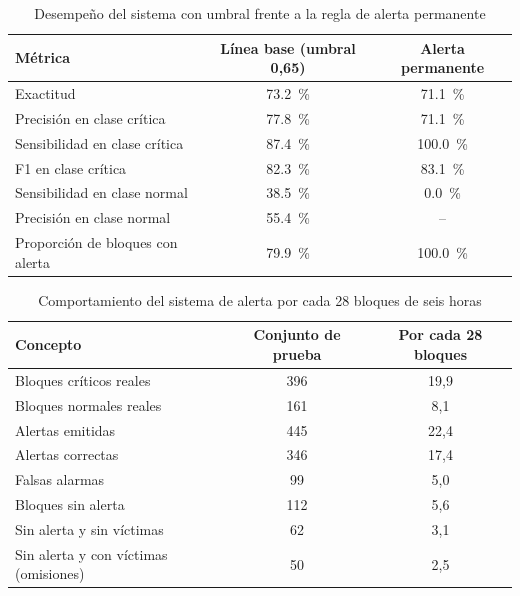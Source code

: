 \begin{table}[htbp]
\centering
\caption{Desempeño del sistema con umbral frente a la regla de alerta permanente}
\label{tab:res-baseline-referencia}
\begin{tabularx}{\linewidth}{@{}>{\raggedright\arraybackslash}Xcc@{}}
\toprule
\textbf{Métrica} & \textbf{Línea base (umbral 0,65)} & \textbf{Alerta permanente} \\
\midrule
Exactitud & \qty{73.2}{\percent} & \qty{71.1}{\percent} \\
Precisión en clase crítica & \qty{77.8}{\percent} & \qty{71.1}{\percent} \\
Sensibilidad en clase crítica & \qty{87.4}{\percent} & \qty{100.0}{\percent} \\
F1 en clase crítica & \qty{82.3}{\percent} & \qty{83.1}{\percent} \\
Sensibilidad en clase normal & \qty{38.5}{\percent} & \qty{0.0}{\percent} \\
Precisión en clase normal & \qty{55.4}{\percent} & -- \\
Proporción de bloques con alerta & \qty{79.9}{\percent} & \qty{100.0}{\percent} \\
\bottomrule
\end{tabularx}
\end{table}

\begin{table}[htbp]
\centering
\caption{Comportamiento del sistema de alerta por cada 28 bloques de seis horas}
\label{tab:res-operativa}
\begin{tabularx}{\linewidth}{@{}>{\raggedright\arraybackslash}Xcc@{}}
\toprule
\textbf{Concepto} & \textbf{Conjunto de prueba} & \textbf{Por cada 28 bloques} \\
\midrule
Bloques críticos reales & 396 & 19,9 \\
Bloques normales reales & 161 & 8,1 \\
\midrule
Alertas emitidas & 445 & 22,4 \\
\quad Alertas correctas & 346 & 17,4 \\
\quad Falsas alarmas & 99 & 5,0 \\
Bloques sin alerta & 112 & 5,6 \\
\quad Sin alerta y sin víctimas & 62 & 3,1 \\
\quad Sin alerta y con víctimas (omisiones) & 50 & 2,5 \\
\bottomrule
\end{tabularx}
\end{table}

